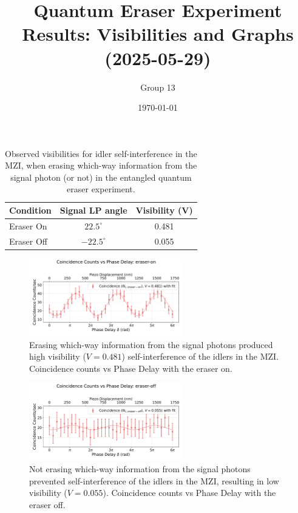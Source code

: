 \documentclass{article}
\title{Quantum Eraser Experiment Results: Visibilities and Graphs (2025-05-29)}
\author{Group 13} %
\date{\today}
\begin{document}
\pagestyle{empty} %

\begin{table}[h!]
\centering
\begin{tabular}{lcc}
\toprule
\textbf{Condition} & \textbf{Signal LP angle} & \textbf{Visibility (V)} \\
\midrule
Eraser On          & $22.5^\circ$  & 0.481 \\
Eraser Off         & $-22.5^\circ$ & 0.055 \\
\bottomrule
\end{tabular}
\caption{
  Observed visibilities for idler self-interference in the MZI,
  when erasing which-way information from the signal photon (or not)
  in the entangled quantum eraser experiment.}
\end{table}


\begin{figure}[h!]
\centering
\includegraphics[width=0.6\textwidth]{coincidence_counts_eraser_on.pdf}
\caption{
  Erasing which-way information from the signal photons
  produced high visibility ($V=0.481$) self-interference of the idlers in the MZI.
  Coincidence counts vs Phase Delay with the eraser on.
}
\end{figure}


\begin{figure}[h!]
\centering
\includegraphics[width=0.6\textwidth]{coincidence_counts_eraser_off.pdf}
\caption{
  Not erasing which-way information from the signal photons
  prevented self-interference of the idlers in the MZI,
  resulting in low visibility ($V=0.055$).
  Coincidence counts vs Phase Delay with the eraser off.
}
\end{figure}
\end{document}
